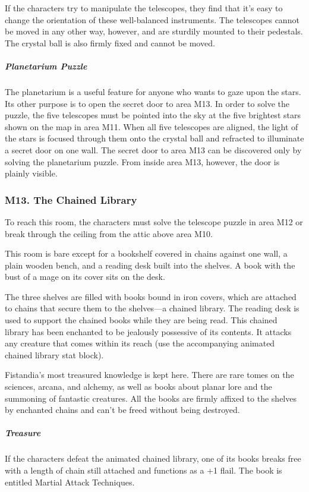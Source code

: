 \documentclass[10pt,a4paper,twoside,bg=print,twocolumn,openany,nodeprecatedcode]{dndbook}
\begin{document}
If the characters try to manipulate the telescopes, they find that it's easy to change the orientation of these well-balanced instruments. The telescopes cannot be moved in any other way, however, and are sturdily mounted to their pedestals. The crystal ball is also firmly fixed and cannot be moved.

\subparagraph{Planetarium Puzzle}
The planetarium is a useful feature for anyone who wants to gaze upon the stars. Its other purpose is to open the secret door to area M13. In order to solve the puzzle, the five telescopes must be pointed into the sky at the five brightest stars shown on the map in area M11. When all five telescopes are aligned, the light of the stars is focused through them onto the crystal ball and refracted to illuminate a secret door on one wall. The secret door to area M13 can be discovered only by solving the planetarium puzzle. From inside area M13, however, the door is plainly visible.

\subsubsection{M13. The Chained Library}
To reach this room, the characters must solve the telescope puzzle in area M12 or break through the ceiling from the attic above area M10.

\begin{DndReadAloud}{}
This room is bare except for a bookshelf covered in chains against one wall, a plain wooden bench, and a reading desk built into the shelves. A book with the bust of a mage on its cover sits on the desk.

\end{DndReadAloud}

The three shelves are filled with books bound in iron covers, which are attached to chains that secure them to the shelves—a chained library. The reading desk is used to support the chained books while they are being read. This chained library has been enchanted to be jealously possessive of its contents. It attacks any creature that comes within its reach (use the accompanying animated chained library stat block).

Fistandia's most treasured knowledge is kept here. There are rare tomes on the sciences, arcana, and alchemy, as well as books about planar lore and the summoning of fantastic creatures. All the books are firmly affixed to the shelves by enchanted chains and can't be freed without being destroyed.

\subparagraph{Treasure}
If the characters defeat the animated chained library, one of its books breaks free with a length of chain still attached and functions as a +1 flail. The book is entitled Martial Attack Techniques.
\end{document}

